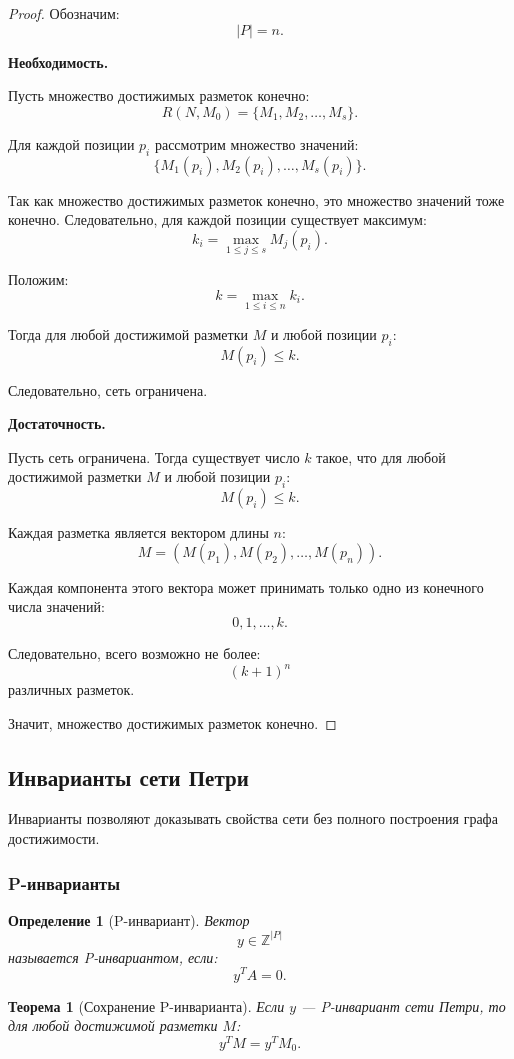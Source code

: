 \documentclass[12pt,a4paper]{article}
\newtheorem{definition}{Определение}
\newtheorem{theorem}{Теорема}
\begin{document}
\begin{proof}
Обозначим:
\[
|P|=n.
\]

\textbf{Необходимость.}

Пусть множество достижимых разметок конечно:
\[
R(N,M_0)=\{M_1,M_2,\dots,M_s\}.
\]

Для каждой позиции $p_i$ рассмотрим множество значений:
\[
\{M_1(p_i),M_2(p_i),\dots,M_s(p_i)\}.
\]

Так как множество достижимых разметок конечно, это множество значений тоже конечно. Следовательно, для каждой позиции существует максимум:
\[
k_i = \max_{1\le j\le s} M_j(p_i).
\]

Положим:
\[
k = \max_{1\le i\le n} k_i.
\]

Тогда для любой достижимой разметки $M$ и любой позиции $p_i$:
\[
M(p_i) \le k.
\]

Следовательно, сеть ограничена.

\textbf{Достаточность.}

Пусть сеть ограничена. Тогда существует число $k$ такое, что для любой достижимой разметки $M$ и любой позиции $p_i$:
\[
M(p_i)\le k.
\]

Каждая разметка является вектором длины $n$:
\[
M=(M(p_1),M(p_2),\dots,M(p_n)).
\]

Каждая компонента этого вектора может принимать только одно из конечного числа значений:
\[
0,1,\dots,k.
\]

Следовательно, всего возможно не более:
\[
(k+1)^n
\]
различных разметок.

Значит, множество достижимых разметок конечно.
\end{proof}

\subsection{Инварианты сети Петри}

Инварианты позволяют доказывать свойства сети без полного построения графа достижимости.

\subsubsection{P-инварианты}

\begin{definition}[P-инвариант]
Вектор
\[
y \in \mathbb{Z}^{|P|}
\]
называется P-инвариантом, если:
\[
y^T A = 0.
\]
\end{definition}

\begin{theorem}[Сохранение P-инварианта]
Если $y$ --- P-инвариант сети Петри, то для любой достижимой разметки $M$:
\[
y^T M = y^T M_0.
\]
\end{theorem}
\end{document}
